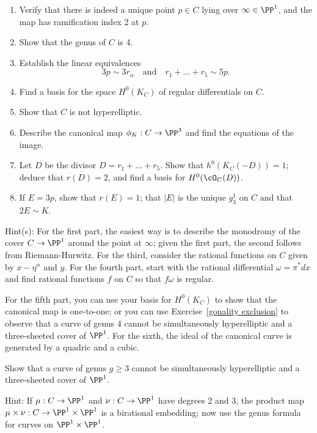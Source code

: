\begin{exercise}
\begin{enumerate}
\item Verify that there is indeed a unique point $p \in C$ lying over $\infty \in \PP^1$, and the map has ramification index 2 at $p$. 
\item Show that the genus of $C$ is 4.
\item Establish the linear equivalences
$$
3p \sim 3r_\alpha \quad \text{and} \quad r_1+ \dots + r_5 \sim 5p.
$$
\item Find a basis for the space $H^0(K_C)$ of regular differentials on $C$.
\item Show that $C$ is not hyperelliptic.
\item Describe the canonical map $\phi_K : C \to \PP^3$ and find the equations of the image.
\item Let $D$ be the divisor $D = r_1+\dots+r_5$. Show that $h^0(K_C(-D)) = 1$; deduce that $r(D) = 2$, and find a basis for $H^0(\cO_C(D))$.
\item If $E = 3p$, show that $r(E) = 1$; that $|E|$ is the unique $g^1_3$ on $C$ and that $2E \sim K$.
\end{enumerate}
\end{exercise}

Hint(s): For the first part, the easiest way is to describe the monodromy of the cover $C \to \PP^1$ around the point at $\infty$; given the first part, the second follows from Riemann-Hurwitz. For the third, consider the rational functions on $C$ given by $x - \eta^\alpha$ and $y$. For the fourth part, start with the rational differential $\omega = \pi^*dx$ and find rational functions $f$ on $C$ so that $f\omega$ is regular.

For the fifth part, you can use your basis for $H^0(K_C)$ to show that the canonical map is one-to-one; or you can use Exercise~\ref{gonality exclusion} to observe that a curve of genus 4 cannot be simultaneously hyperelliptic and a three-sheeted cover of $\PP^1$. For the sixth, the ideal of the canonical curve is generated by a quadric and a cubic.

\begin{exercise}\label{gonality exclusion}
Show that a curve of genus $g \geq 3$ cannot be simultaneously hyperelliptic and a three-sheeted cover of $\PP^1$.
\end{exercise}

Hint: If $\mu : C \to \PP^1$ and $\nu : C \to \PP^1$ have degrees 2 and 3, the product map $\mu \times \nu : C \to \PP^1 \times \PP^1$ is a birational embedding; now use the genus formula for curves on $\PP^1 \times \PP^1$.


